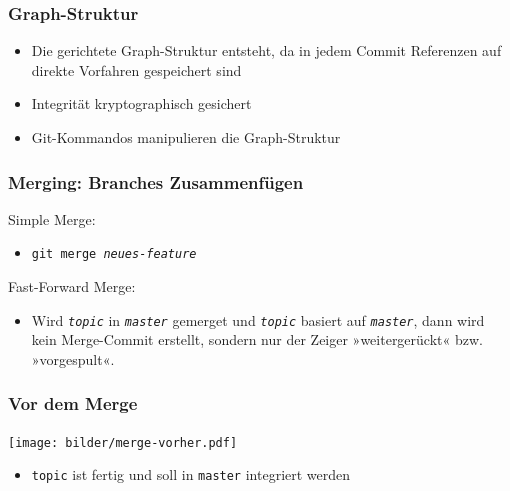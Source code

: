 \documentclass{beamer}
\begin{document}
\begin{frame}
 \frametitle{Graph-Struktur}
  


\begin{itemize}
  \item Die gerichtete Graph-Struktur entsteht, da in jedem Commit Referenzen auf direkte Vorfahren gespeichert sind
\end{itemize}

\begin{itemize}
  \item Integrität kryptographisch gesichert
\end{itemize}

\begin{itemize}
  \item Git-Kommandos manipulieren die Graph-Struktur
\end{itemize}

  
 \end{frame}
\begin{frame}
 \frametitle{Merging: Branches Zusammenfügen}
  


Simple Merge:
\begin{itemize}
  \item \texttt{git merge \emph{neues-feature}}
\end{itemize}


\vspace{.5cm}


Fast-Forward Merge:
\begin{itemize}
  \item Wird \texttt{\emph{topic}} in \texttt{\emph{master}} gemerget und \texttt{\emph{topic}} basiert auf \texttt{\emph{master}}, dann wird kein Merge-Commit erstellt, sondern nur der Zeiger »weitergerückt« bzw. »vorgespult«.
\end{itemize}

  
 \end{frame}
\begin{frame}
 \frametitle{Vor dem Merge}
  


\begin{center}
\texttt{[image: bilder/merge-vorher.pdf]}
\end{center}

\begin{itemize}
  \item \texttt{topic} ist fertig und soll in \texttt{master} integriert werden
\end{itemize}

  
 \end{frame}
\end{document}
